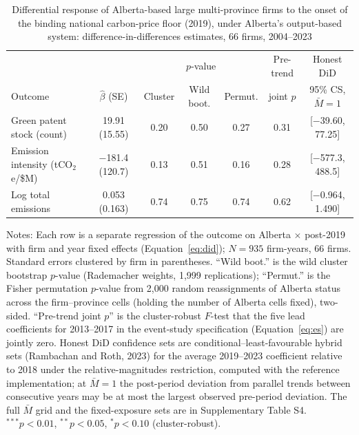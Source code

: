 \begin{table}[htbp]\centering\small
\caption{Differential response of Alberta-based large multi-province firms to the onset of the binding national carbon-price floor (2019), under Alberta's output-based system: difference-in-differences estimates, 66 firms, 2004--2023}
\label{tab:main}
\begin{adjustbox}{max width=\textwidth}
\begin{tabular}{lcccccc}
\toprule
 & & \multicolumn{3}{c}{$p$-value} & Pre-trend & Honest DiD \\
\cmidrule(lr){3-5}
Outcome & $\hat\beta$ (SE) & Cluster & Wild boot. & Permut. & joint $p$ & 95\% CS, $\bar M=1$ \\
\midrule
Green patent stock (count) & 19.91 (15.55) & 0.20 & 0.50 & 0.27 & 0.31 & [$-$39.60, 77.25] \\
Emission intensity (tCO$_2$e/\$M) & $-$181.4 (120.7) & 0.13 & 0.51 & 0.16 & 0.28 & [$-$577.3, 488.5] \\
Log total emissions & 0.053 (0.163) & 0.74 & 0.75 & 0.74 & 0.62 & [$-$0.964, 1.490] \\
\bottomrule
\end{tabular}
\end{adjustbox}
\par\vspace{3pt}\begin{minipage}{\textwidth}\footnotesize
Notes: Each row is a separate regression of the outcome on Alberta $\times$ post-2019 with firm and year fixed effects (Equation~\ref{eq:did}); $N=935$ firm-years, 66 firms. Standard errors clustered by firm in parentheses. ``Wild boot.'' is the wild cluster bootstrap $p$-value (Rademacher weights, 1,999 replications); ``Permut.'' is the Fisher permutation $p$-value from 2,000 random reassignments of Alberta status across the firm--province cells (holding the number of Alberta cells fixed), two-sided. ``Pre-trend joint $p$'' is the cluster-robust $F$-test that the five lead coefficients for 2013--2017 in the event-study specification (Equation~\ref{eq:es}) are jointly zero. Honest DiD confidence sets are conditional--least-favourable hybrid sets (Rambachan and Roth, 2023) for the average 2019--2023 coefficient relative to 2018 under the relative-magnitudes restriction, computed with the reference implementation; at $\bar M=1$ the post-period deviation from parallel trends between consecutive years may be at most the largest observed pre-period deviation. The full $\bar M$ grid and the fixed-exposure sets are in Supplementary Table S4. $^{***}p<0.01$, $^{**}p<0.05$, $^{*}p<0.10$ (cluster-robust).
\end{minipage}
\end{table}

